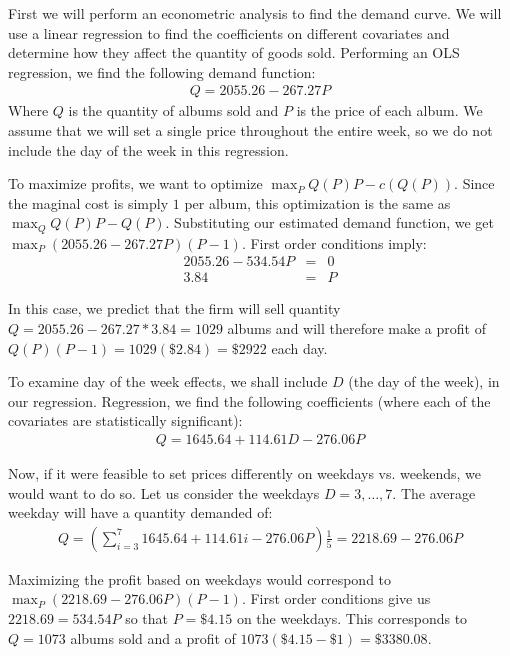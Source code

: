 \documentclass[psamsfonts]{amsart}
\newenvironment{sol}{{\bfseries Solution:}}{\qedsymbol}
\begin{document}
\begin{sol}
First we will perform an econometric analysis to find the demand curve. We will use a linear regression to find the coefficients on different covariates and determine how they affect the quantity of goods sold. Performing an OLS regression, we find the following demand function:
\begin{eqnarray}
Q = 2055.26 - 267.27P
\end{eqnarray}
Where $Q$ is the quantity of albums sold and $P$ is the price of each album. We assume that we will set a single price throughout the entire week, so we do not include the day of the week in this regression. 

To maximize profits, we want to optimize $\max_{P} Q(P)P - c(Q(P))$. Since the maginal cost is simply $1$ per album, this optimization is the same as $\max_{Q} Q(P)P - Q(P)$. Substituting our estimated demand function, we get $\max_{P} (2055.26 - 267.27P)(P-1)$. First order conditions imply:
\begin{eqnarray}
2055.26 - 534.54P &=& 0 \\
3.84 &=& P
\end{eqnarray}

In this case, we predict that the firm will sell quantity $Q = 2055.26 - 267.27*3.84 = 1029$ albums and will therefore make a profit of $Q(P)(P-1) = 1029(\$2.84) = \$2922$ each day. 

To examine day of the week effects, we shall include $D$ (the day of the week), in our regression. Regression, we find the following coefficients (where each of the covariates are statistically significant):
\begin{eqnarray}
Q = 1645.64 + 114.61D - 276.06P
\end{eqnarray}

Now, if it were feasible to set prices differently on weekdays vs. weekends, we would want to do so. Let us consider the weekdays $D=3,\ldots,7$. The average weekday will have a quantity demanded of:
\begin{eqnarray}
Q = \left( \sum_{i=3}^7 1645.64 + 114.61i - 276.06P \right) \frac{1}{5} = 2218.69 - 276.06P
\end{eqnarray}

Maximizing the profit based on weekdays would correspond to $\max_{P} (2218.69 -276.06 P)(P-1)$. First order conditions give us $2218.69 = 534.54P$ so that $P= \$4.15$ on the weekdays. This corresponds to $Q = 1073$ albums sold and a profit of $1073(\$4.15 - \$1) = \$3380.08$. 


\end{sol}
\end{document}
